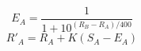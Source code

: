\begin{equation}
    E_A = \frac{1}{1 + 10^{(R_B - R_A)/400}}
\end{equation}
\begin{equation}
    R'_A = R_A + K(S_A - E_A)
\end{equation}
